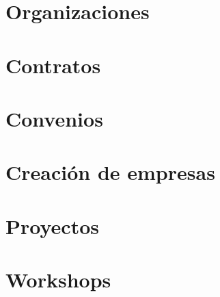 \documentclass[a4paper]{article}
\begin{document}

%

\renewcommand{\refname}{}

\section*{Organizaciones}
\label{sec:organizations}
\vspace{-5ex}


\section*{Contratos}
\label{sec:contratos}
\vspace{-5ex}


\section*{Convenios}
\label{sec:convenios}
\vspace{-5ex}


\section*{Creación de empresas}
\label{sec:empresas}
\vspace{-5ex}


\section*{Proyectos}
\label{sec:proyectos}
\vspace{-5ex}


\section*{Workshops}
\label{sec:workshops}
\vspace{-5ex}


\end{document}
